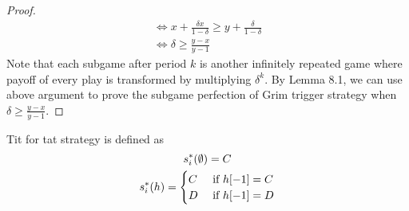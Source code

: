 \documentclass[11pt]{article}
\begin{document}
\begin{proposition}
\begin{proof}
\begin{gather}
								\iff x + \frac{\delta x}{1 - \delta} \geq y + \frac{\delta}{1-\delta} \\
								\iff \delta \geq \frac{y-x}{y-1}
							\end{gather}
							Note that each subgame after period $k$ is another infinitely repeated game where payoff of every play is transformed by multiplying $\delta^k$. By Lemma 8.1, we can use above argument to prove the subgame perfection of Grim trigger strategy when $\delta \geq \frac{y - x}{y - 1}$.
						\end{proof}
					\end{proposition}
					
					\begin{example}
						Tit for tat strategy is defined as
						\begin{gather}
							s_i^*(\emptyset) = C \\
							s_i^*(h) = \begin{cases}
								C &\text{{ if }} h[-1] = C \\
								D &\text{{ if }} h[-1] = D
							\end{cases}
						\end{gather}
					\end{example}
					
					
\end{document}
